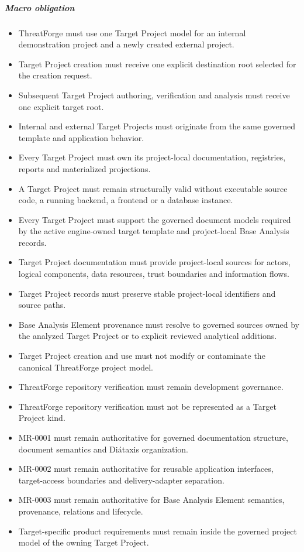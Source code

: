 \documentclass[
  10pt,
]{article}
\providecommand{\tightlist}{%
  \setlength{\itemsep}{0pt}\setlength{\parskip}{0pt}}
\begin{document}
\subparagraph{Macro obligation}\label{macro-obligation-3}

\begin{itemize}
\tightlist
\item
  ThreatForge must use one Target Project model for an internal
  demonstration project and a newly created external project.
\item
  Target Project creation must receive one explicit destination root
  selected for the creation request.
\item
  Subsequent Target Project authoring, verification and analysis must
  receive one explicit target root.
\item
  Internal and external Target Projects must originate from the same
  governed template and application behavior.
\item
  Every Target Project must own its project-local documentation,
  registries, reports and materialized projections.
\item
  A Target Project must remain structurally valid without executable
  source code, a running backend, a frontend or a database instance.
\item
  Every Target Project must support the governed document models
  required by the active engine-owned target template and project-local
  Base Analysis records.
\item
  Target Project documentation must provide project-local sources for
  actors, logical components, data resources, trust boundaries and
  information flows.
\item
  Target Project records must preserve stable project-local identifiers
  and source paths.
\item
  Base Analysis Element provenance must resolve to governed sources
  owned by the analyzed Target Project or to explicit reviewed
  analytical additions.
\item
  Target Project creation and use must not modify or contaminate the
  canonical ThreatForge project model.
\item
  ThreatForge repository verification must remain development
  governance.
\item
  ThreatForge repository verification must not be represented as a
  Target Project kind.
\item
  MR-0001 must remain authoritative for governed documentation
  structure, document semantics and Diátaxis organization.
\item
  MR-0002 must remain authoritative for reusable application interfaces,
  target-access boundaries and delivery-adapter separation.
\item
  MR-0003 must remain authoritative for Base Analysis Element semantics,
  provenance, relations and lifecycle.
\item
  Target-specific product requirements must remain inside the governed
  project model of the owning Target Project.
\end{itemize}
\end{document}
